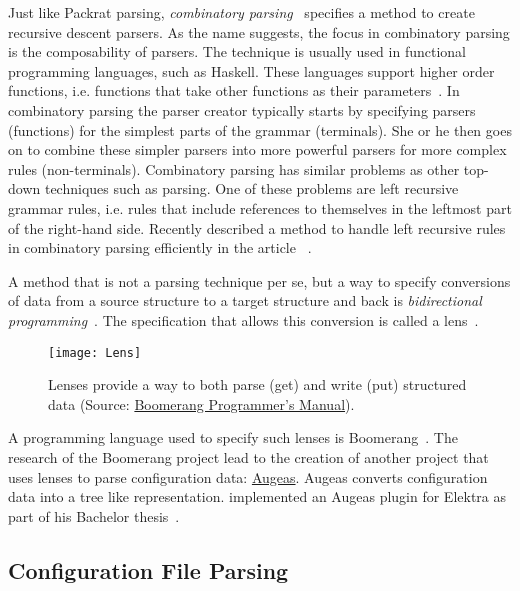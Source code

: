 Just like Packrat parsing, \emph{combinatory parsing}~\cite{frost1992constructing, hutton1992higher} specifies a method to create recursive descent parsers. As the name suggests, the focus in combinatory parsing is the composability of parsers. The technique is usually used in functional programming languages, such as Haskell. These languages support higher order functions, i.e. functions that take other functions as their parameters~\cite[p. 564]{grune2008parsing}. In combinatory parsing the parser creator typically starts by specifying parsers (functions) for the simplest parts of the grammar (terminals). She or he then goes on to combine these simpler parsers into more powerful parsers for more complex rules (non-terminals). Combinatory parsing has similar problems as other top-down techniques such as  parsing. One of these problems are left recursive grammar rules, i.e. rules that include references to themselves in the leftmost part of the right-hand side. Recently \citeauthor{frost2007modular} described a method to handle left recursive rules in combinatory parsing efficiently in the article ~\cite{frost2007modular}.

A method that is not a parsing technique per se, but a way to specify conversions of data from a source structure to a target structure and back is \emph{bidirectional programming}~\cite{foster2005combinators, bohannon2006relational}. The specification that allows this conversion is called a lens~\cite{foster2005combinators}.

\begin{figure}[H]
  \centering
    \texttt{[image: Lens]}
  \caption{Lenses provide a way to both parse (get) and write (put) structured data \newline (Source: \href{http://www.seas.upenn.edu/~harmony/manual.pdf}{Boomerang Programmer’s Manual}).}
\end{figure}

A programming language used to specify such lenses is Boomerang~\cite{bohannon2008boomerang}. The research of the Boomerang project lead to the creation of another project that uses lenses to parse configuration data: \href{http://augeas.net}{Augeas}. Augeas converts configuration data into a tree like representation. \citeauthor{berlakovich2016universal} implemented an Augeas plugin for Elektra as part of his Bachelor thesis~\cite{berlakovich2016universal}.

\subsection{Configuration File Parsing}
\label{sec:configuration_file_parsing}

